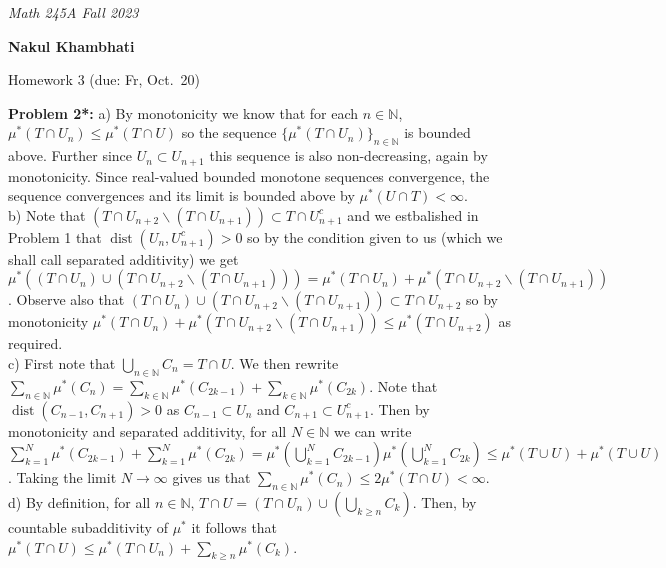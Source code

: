 \documentclass[12pt]{amsart} %
\newcommand\N{\ensuremath{\mathbb{N}}}
\def\N{\mathbb{N}}
\newcommand{\dist} {\operatorname{dist}}
\begin{document}
\thispagestyle{empty}
\pagestyle{empty}
\noindent 
\textsl{Math 245A  \hfill Fall  2023}

\bigskip
\centerline {\textbf{Nakul Khambhati}}
\bigskip
\centerline {Homework 3 (due: Fr, Oct.~20) }

 

\bigskip
\noindent


\textbf{Problem 2*:}
a) By monotonicity we know that for each $n \in \N$, $\mu^*(T \cap U_n) \le \mu^*(T \cap U)$ so the sequence $\{\mu^*(T\cap U_n)\}_{n \in \N}$ is bounded above. Further since $U_n \subset U_{n+1}$ this sequence is also non-decreasing, again by monotonicity. Since real-valued bounded monotone sequences convergence, the sequence convergences and its limit is bounded above by $\mu^*(U \cap T) < \infty$.\\ 
 
b) Note that $ \left( T \cap U_{n+2} \backslash (T \cap U_{n+1}) \right) \subset  T \cap U_{n+1}^c$ and we estbalished in Problem 1 that  $\dist\left( U_n, U_{n+1}^c \right) > 0$ so by the condition given to us (which we shall call separated additivity) we get $\mu^*\left( (T \cap U_n) \cup \left( T \cap U_{n+2} \backslash (T \cap U_{n+1}) \right)  \right) =  \mu^*(T \cap U_n) + \mu^*\left( T \cap U_{n+2} \backslash (T \cap U_{n+1}) \right)$. Observe also that $(T \cap U_n) \cup \left( T \cap U_{n+2} \backslash (T \cap U_{n+1}) \right)  \subset T \cap U_{n+2}$ so by monotonicity $ \mu^*(T \cap U_n) + \mu^*\left( T \cap U_{n+2} \backslash (T \cap U_{n+1}) \right) \le  \mu^*(T \cap U_{n+2})$ as required.  \\ 

c) First note that $\bigcup_{n \in \N} C_n = T \cap U$. We then rewrite $\sum_{n \in \N} \mu^*(C_n) = \sum_{k \in \N} \mu^*(C_{2k-1}) + \sum_{k \in \N} \mu^*(C_{2k})$. Note that $\dist(C_{n-1}, C_{n+1}) > 0$ as $C_{n-1} \subset U_n$ and $C_{n+1} \subset U_{n+1}^c$. Then by monotonicity and separated additivity, for all $N \in \N$ we can write $\sum_{k = 1}^N  \mu^*(C_{2k-1}) + \sum_{k = 1}^N  \mu^*(C_{2k}) = \mu^*(\bigcup_{k = 1}^N C_{2k-1}) \mu^*(\bigcup_{k = 1}^N C_{2k}) \le \mu^*(T \cup U) + \mu^*(T \cup U)$. Taking the limit $N \to \infty$ gives us that $\sum_{n \in \N} \mu^*(C_n) \le  2 \mu^*(T \cap U) < \infty$. \\

d) By definition, for all $n \in \N$, $T \cap U = (T \cap U_n) \cup (\bigcup_{k \ge n}C_k)$. Then, by countable subadditivity of $\mu^*$ it follows that  $\mu^*(T \cap U) \le \mu^*(T \cap U_n) + \sum_{k \geq n}\mu^*(C_k)$. \\
\end{document}
